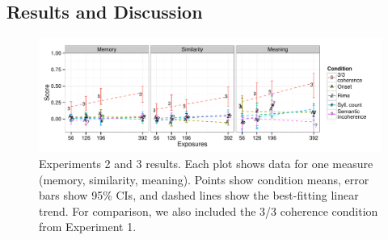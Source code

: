 \documentclass[man,floatsintext]{apa6}
\begin{document}
\subsection{Results and Discussion}

\begin{figure}[t]
  \begin{center}
    \includegraphics[width=1.0\linewidth]{x23.pdf}
    \caption{Experiments 2 and 3 results. Each plot shows data for one
measure (memory, similarity, meaning). Points show condition means,
error bars show 95\% CIs, and dashed lines show the best-fitting
linear trend. For comparison, we also included the 3/3 coherence
condition from Experiment 1.}
    \label{expt23-results}
  \end{center}
\end{figure}
\end{document}

